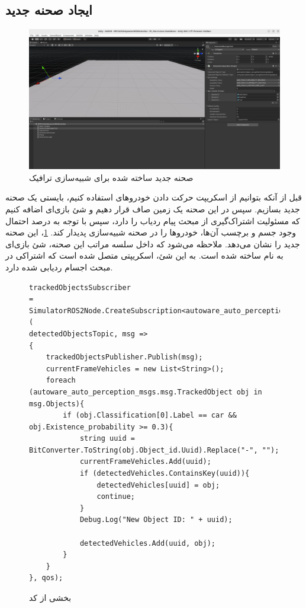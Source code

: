 \subsection{ایجاد صحنه جدید}
\begin{figure}[h!]
    \centering
    \includegraphics[width=1\linewidth]{figures/NPCVehicleSpawnerWithDetectionScene.png}
    \caption{صحنه جدید ساخته شده برای شبیه‌سازی ترافیک}
    \label{fig:NPCVehicleSpawnerWithDetectionScene}
\end{figure}
قبل از آنکه بتوانیم از اسکریپت حرکت دادن خودروهای  استفاده کنیم، بایستی یک صحنه جدید بسازیم.
سپس در این صحنه یک زمین صاف قرار دهیم و شئ بازی‌ای اضافه کنیم که مسئولیت اشتراک‌گیری از مبحث پیام ردیاب را دارد، سپس با توجه به درصد احتمال وجود جسم و برچسب آن‌ها، خودرو‌ها را در صحنه شبیه‌سازی پدیدار کند. 
\cref{fig:NPCVehicleSpawnerWithDetectionScene}، این صحنه جدید را نشان می‌دهد. ملاحظه می‌شود که داخل سلسه‌ مراتب این صحنه، شئ بازی‌ای به نام  ساخته شده است. به این شئ، اسکریپتی متصل شده است که اشتراکی در مبحث اجسام ردیابی شده دارد. 
\begin{figure}[h!]
    \centering
    \begin{latin}
        \begin{lstlisting}[style=codecs]
trackedObjectsSubscriber
= SimulatorROS2Node.CreateSubscription<autoware_auto_perception_msgs.msg.TrackedObjects>(
detectedObjectsTopic, msg =>
{
    trackedObjectsPublisher.Publish(msg);
    currentFrameVehicles = new List<String>();
    foreach (autoware_auto_perception_msgs.msg.TrackedObject obj in msg.Objects){
        if (obj.Classification[0].Label == car && obj.Existence_probability >= 0.3){
            string uuid = BitConverter.ToString(obj.Object_id.Uuid).Replace("-", "");
            currentFrameVehicles.Add(uuid);
            if (detectedVehicles.ContainsKey(uuid)){
                detectedVehicles[uuid] = obj;
                continue;
            }
            Debug.Log("New Object ID: " + uuid);
        
            detectedVehicles.Add(uuid, obj);
        }
    }
}, qos);
        \end{lstlisting}
    \end{latin}
    \caption{بخشی از کد }
    \label{fig:DetectionSubscriber1}
\end{figure}

